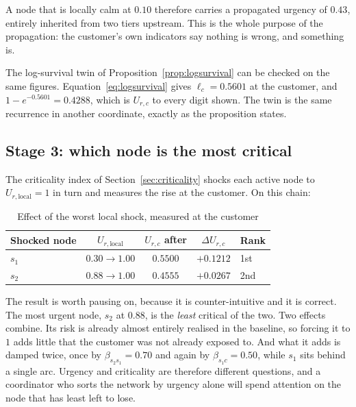 A node that is locally calm at $0.10$ therefore carries a propagated urgency of $0.43$,
entirely inherited from two tiers upstream. This is the whole purpose of the propagation: the
customer's own indicators say nothing is wrong, and something is.

The log-survival twin of Proposition~\ref{prop:logsurvival} can be checked on the same
figures. Equation~\ref{eq:logsurvival} gives $\ell_c = 0.5601$ at the customer, and
$1 - e^{-0.5601} = 0.4288$, which is $U_{r,c}$ to every digit shown. The twin is the same
recurrence in another coordinate, exactly as the proposition states.

\subsection{Stage 3: which node is the most critical}

The criticality index of Section~\ref{sec:criticality} shocks each active node to
$U_{r,\text{local}} = 1$ in turn and measures the rise at the customer. On this chain:

\begin{table}[htbp]
\centering
\caption[Worked example: criticality]{Effect of the worst local shock, measured at the
customer}
\label{tab:worked_crit}
\small
\begin{tabularx}{\linewidth}{@{}l c c c X@{}}
\toprule
\textbf{Shocked node} & \textbf{$U_{r,\text{local}}$} & \textbf{$U_{r,c}$ after} &
\textbf{$\Delta U_{r,c}$} & \textbf{Rank} \\
\midrule
$s_1$ & $0.30 \to 1.00$ & $0.5500$ & $+0.1212$ & 1st \\
$s_2$ & $0.88 \to 1.00$ & $0.4555$ & $+0.0267$ & 2nd \\
\bottomrule
\end{tabularx}
\end{table}

The result is worth pausing on, because it is counter-intuitive and it is correct. The most
urgent node, $s_2$ at $0.88$, is the \emph{least} critical of the two. Two effects combine.
Its risk is already almost entirely realised in the baseline, so forcing it to $1$ adds
little that the customer was not already exposed to. And what it adds is damped twice, once
by $\beta_{s_2 s_1} = 0.70$ and again by $\beta_{s_1 c} = 0.50$, while $s_1$ sits behind a
single arc. Urgency and criticality are therefore different questions, and a coordinator who
sorts the network by urgency alone will spend attention on the node that has least left to
lose.

